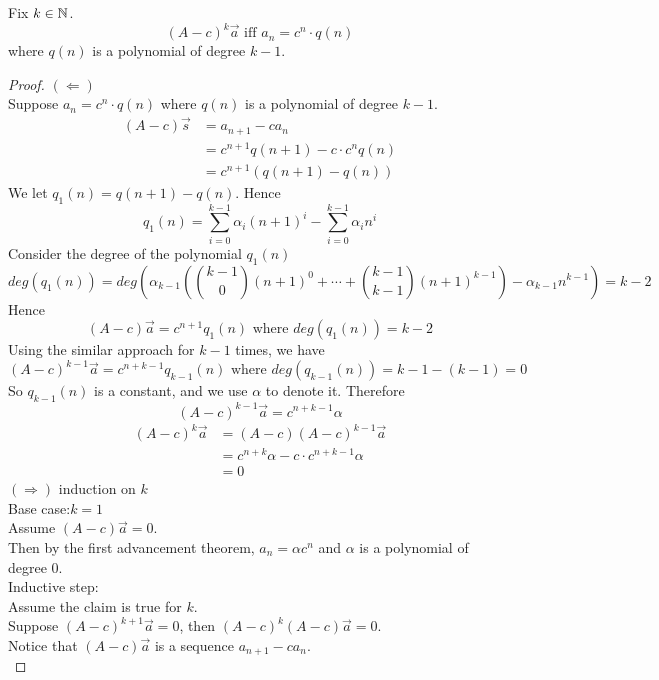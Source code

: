 \begin{theorem}
    Fix $k \in \mathbb{N}$.
    $$(A-c)^k\vec{a} \text{ iff } a_n=c^n \cdot q(n)$$
    where $q(n)$ is a polynomial of degree $k-1$.
\end{theorem}
\begin{proof}
    $(\Leftarrow)$\\
    Suppose $a_n=c^n \cdot q(n)$ where $q(n)$ is a polynomial of degree $k-1$.
    \begin{equation}
        \begin{split}
            (A-c)\vec{s} &= a_{n+1}-ca_n\\
            &= c^{n+1}q(n+1)-c\cdot c^nq(n)\\
            &= c^{n+1}(q(n+1)-q(n))
        \end{split}
    \end{equation}
    We let $q_1(n)=q(n+1)-q(n)$. Hence $$q_1(n)=\sum_{i=0}^{k-1}\alpha_i(n+1)^i-\sum_{i=0}^{k-1}\alpha_in^i$$
    Consider the degree of the polynomial $q_1(n)$
    $$deg(q_1(n))=deg(\alpha_{k-1}({k-1 \choose 0}(n+1)^0+ \cdots +{k-1 \choose k-1}(n+1)^{k-1})-\alpha_{k-1}n^{k-1})=k-2$$
    Hence $$(A-c)\vec{a}=c^{n+1}q_1(n) \text{ where } deg(q_1(n))=k-2$$
    Using the similar approach for $k-1$ times, we have 
    $$(A-c)^{k-1}\vec{a}=c^{n+k-1}q_{k-1}(n) \text{ where } deg(q_{k-1}(n))=k-1-(k-1)=0$$
    So $q_{k-1}(n)$ is a constant, and we use $\alpha$ to denote it.
    Therefore $$(A-c)^{k-1}\vec{a}=c^{n+k-1}\alpha$$
    \begin{equation}
        \begin{split}
            (A-c)^{k}\vec{a} &= (A-c)(A-c)^{k-1}\vec{a}\\
            &= c^{n+k}\alpha-c \cdot c^{n+k-1}\alpha\\
            &= 0
        \end{split}
    \end{equation}
    $(\Rightarrow)$ induction on $k$\\
    Base case:$k=1$\\
    Assume $(A-c)\vec{a}=0$.\\
    Then by the first advancement theorem, $a_n=\alpha c^n$ and $\alpha$ is a polynomial of degree 0.\\
    Inductive step:\\
    Assume the claim is true for $k$.\\
    Suppose $(A-c)^{k+1}\vec{a}=0$, then $(A-c)^k(A-c)\vec{a}=0$.\\
    Notice that $(A-c)\vec{a}$ is a sequence $a_{n+1}-ca_n$.\\

\end{proof}
